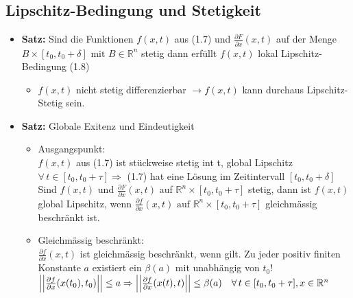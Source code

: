 \documentclass[11pt,a4paper]{article}
\begin{document}
\subsection{Lipschitz-Bedingung und Stetigkeit}
\begin{itemize}
\item \textbf{Satz:}
Sind die Funktionen $f(x,t)$ aus (1.7) und $\frac{\partial F}{\partial x} (x, t)$ auf der Menge $B\times \left[t_0, t_0 + \delta \right] \text{ mit } B \in \mathbb{R}^n$ stetig dann erfüllt $f(x,t)$ lokal Lipschitz-Bedingung (1.8) 
\begin{itemize}
\item $f(x,t)$ nicht stetig differenzierbar $\rightarrow f(x,t)$ kann durchaus Lipschitz-Stetig sein.
\end{itemize}
\item \textbf{Satz:} Globale Exitenz und Eindeutigkeit
\begin{itemize}
\item Ausgangspunkt: \\$f(x,t)$ aus (1.7) ist stückweise stetig int t, global Lipschitz $\forall \, t \in [t_0 , t_0 + \tau] \Rightarrow$ (1.7) hat eine Lösung im Zeitintervall $[t_0 , t_0 + \delta]$\\
Sind $f(x,t)$ und $\frac{\partial F}{\partial x} (x,t) $ auf $\mathbb{R}^n \times [t_0, t_0 + \tau] $ stetig, dann ist $f(x,t) $ global Lipschitz, wenn $\frac{\partial f}{\partial x} (x,t) \text{ auf } \mathbb{R}^n \times [ t_0 , t_0+\tau] $ gleichmässig beschränkt ist.
\item Gleichmässig beschränkt:\\ $\frac{\partial f}{\partial x} (x,t) $ ist gleichmässig beschränkt, wenn gilt. Zu jeder positiv finiten Konstante $a$ existiert ein $\beta(a) $ mit unabhängig von $t_0$!\\
$
\left|\left| \frac{\partial f}{\partial x}(x(t_0) , t_0) \right| \right| \leq a \Rightarrow
\left|\left| \frac{\partial f}{\partial x} (x(t) , t) \right|\right| \leq \beta(a) \quad \forall \, t\in[t_0, t_0+\tau], x\in \mathbb{R}^n\\
$
\end{itemize}
\end{itemize}
\end{document}
